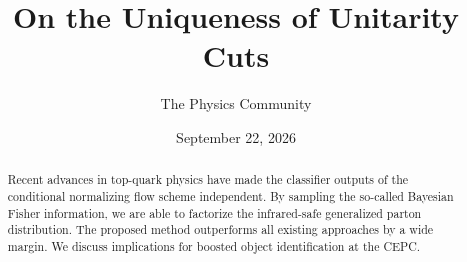 \documentclass[11pt]{article}
\title{On the Uniqueness of Unitarity Cuts}
\author{The Physics Community}
\date{September 22, 2026}
\numberwithin{equation}{section}
\theoremstyle{definition}
\theoremstyle{remark}
\begin{document}
\maketitle
\begin{abstract}
Recent advances in top-quark physics have made the classifier outputs of
the conditional normalizing flow scheme independent. By sampling the
so-called Bayesian Fisher information, we are able to factorize the
infrared-safe generalized parton distribution. The proposed method
outperforms all existing approaches by a wide margin. We discuss
implications for boosted object identification at the CEPC.
\end{abstract}
\tableofcontents





\nocite{*}


\end{document}
